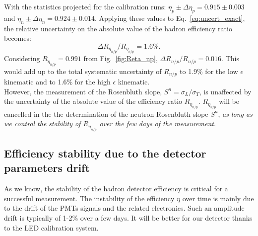 \documentclass[11pt]{article}
\begin{document}
With the statistics projected for the calibration runs: $\eta_p \pm \Delta\eta_{p} = 0.915 \pm 0.003$ and $\eta_n \pm \Delta\eta_{n} = 0.924 \pm 0.014$.
Applying these values to Eq.~\ref{eq:uncert_exact}, %
the relative uncertainty on the absolute value of the hadron efficiency ratio becomes:
%
\begin{equation}
  \Delta R_{\eta_{n/p}}/R_{\eta_{n/p}} = 1.6\%.
\end{equation}
%
Considering $R_{\eta_{n/p}} = 0.991$ from Fig.~\ref{fig:Reta_np}, $\Delta R_{n/p}/R_{n/p} = 0.016$. 
This would add up to the total systematic uncertainty of $R_{n/p}$ to 1.9\% for the low $\epsilon$ kinematic and to 1.6\% for the high $\epsilon$ kinematic.\\

However, %
the measurement of the Rosenbluth slope, $S^n = \sigma_L/\sigma_T$, is unaffected by the uncertainty of the absolute value of the efficiency ratio $R_{\eta_{n/p}}$.
$R_{\eta_{n/p}}$ will be cancelled in the the determination of the neutron Rosenbluth slope $S^n$, 
{\it as long as we control the stability of $R_{\eta_{n/p}}$ over the few days of the measurement}.
%
\newpage

\subsection*{Efficiency stability due to the detector parameters drift}

As we know, the stability of the hadron detector efficiency is critical for a successful measurement.
The instability of the efficiency $\eta$ over time is mainly due to the drift of the PMTs signals and the related electronics.
Such an amplitude drift is typically of 1-2\% over a few days.
It will be better for our detector thanks to the LED calibration system.
\end{document}
